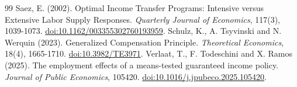 \documentclass[11pt,a4paper]{article}
\begin{document}
\begin{thebibliography}{99}
 Saez, E. (2002). Optimal Income Transfer Programs: Intensive versus Extensive Labor Supply Responses. \emph{Quarterly Journal of Economics}, 117(3), 1039-1073. \href{https://doi.org/10.1162/003355302760193959}{doi:10.1162/003355302760193959}.
 Schulz, K., A. Tsyvinski and N. Werquin (2023). Generalized Compensation Principle. \emph{Theoretical Economics}, 18(4), 1665-1710. \href{https://doi.org/10.3982/TE3971}{doi:10.3982/TE3971}.
 Verlaat, T., F. Todeschini and X. Ramos (2025). The employment effects of a means-tested guaranteed income policy. \emph{Journal of Public Economics}, 105420. \href{https://doi.org/10.1016/j.jpubeco.2025.105420}{doi:10.1016/j.jpubeco.2025.105420}.
\end{thebibliography}
\end{document}

